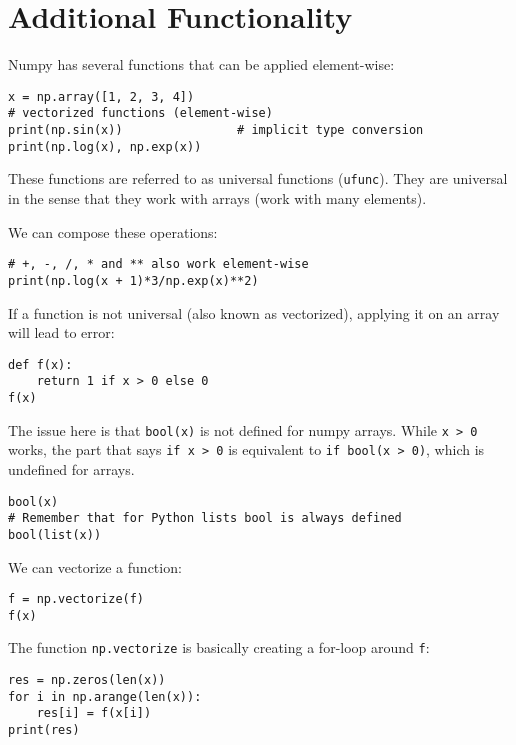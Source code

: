 \documentclass[12pt, a4paper]{article}
\begin{document}
\section{Additional Functionality}
\label{sec:org8eb4b58}
Numpy has several functions that can be applied element-wise:
\lstset{language=jupyter-python,label= ,caption= ,captionpos=b,numbers=none}
\begin{lstlisting}
x = np.array([1, 2, 3, 4])
# vectorized functions (element-wise)
print(np.sin(x))                # implicit type conversion
print(np.log(x), np.exp(x))
\end{lstlisting}
These functions are referred to as universal functions (\texttt{ufunc}).
They are universal in the sense that they work with arrays (work with many elements).

We can compose these operations:
\lstset{language=jupyter-python,label= ,caption= ,captionpos=b,numbers=none}
\begin{lstlisting}
# +, -, /, * and ** also work element-wise
print(np.log(x + 1)*3/np.exp(x)**2)
\end{lstlisting}

If a function is not universal (also known as vectorized), applying it on an array will lead to error:
\lstset{language=jupyter-python,label= ,caption= ,captionpos=b,numbers=none}
\begin{lstlisting}
def f(x):
    return 1 if x > 0 else 0
f(x)
\end{lstlisting}

The issue here is that \texttt{bool(x)} is not defined for numpy arrays.
While \texttt{x > 0} works, the part that says \texttt{if x > 0} is equivalent to \texttt{if bool(x > 0)}, which is undefined for arrays.
\lstset{language=jupyter-python,label= ,caption= ,captionpos=b,numbers=none}
\begin{lstlisting}
bool(x)
# Remember that for Python lists bool is always defined
bool(list(x))
\end{lstlisting}

We can vectorize a function:
\lstset{language=jupyter-python,label= ,caption= ,captionpos=b,numbers=none}
\begin{lstlisting}
f = np.vectorize(f)
f(x)
\end{lstlisting}

The function \texttt{np.vectorize} is basically creating a for-loop around \texttt{f}:
\lstset{language=jupyter-python,label= ,caption= ,captionpos=b,numbers=none}
\begin{lstlisting}
res = np.zeros(len(x))
for i in np.arange(len(x)):
    res[i] = f(x[i])
print(res)
\end{lstlisting}
\end{document}
